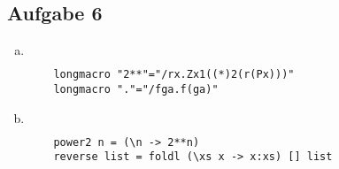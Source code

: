 \documentclass[11, 12pt]{article}
\begin{document}
\begin{enumerate}[(a)]
\section*{Aufgabe 6}
\begin{enumerate}[(a)]
\item ${}$\\
\begin{minipage}{\linewidth}
	\begin{verbatim}
	longmacro "2**"="/rx.Zx1((*)2(r(Px)))"
	longmacro "."="/fga.f(ga)"
	\end{verbatim}
\end{minipage}
\item ${}$\\
\begin{minipage}{\linewidth}
	\begin{verbatim}
	power2 n = (\n -> 2**n)
	reverse list = foldl (\xs x -> x:xs) [] list
	\end{verbatim}
\end{minipage}
\end{enumerate}


\end{enumerate}
\end{document}
